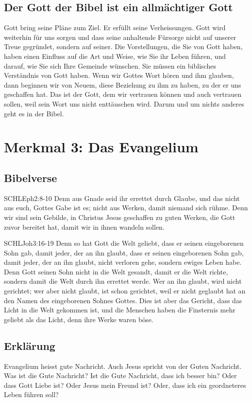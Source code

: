 \documentclass{../../inc/mybib}
\begin{document}
\subsection{Der Gott der Bibel ist ein allmächtiger Gott}
Gott bring seine Pläne zum Ziel. Er erfüllt seine Verheissungen. Gott wird weiterhin für uns sorgen und dass seine anhaltende Fürsorge nicht auf unserer Treue gegründet, sondern auf seiner. Die Vorstellungen, die Sie von Gott haben, haben einen Einfluss auf die Art und Weise, wie Sie ihr Leben führen, und darauf, wie Sie sich Ihre Gemeinde wünschen. Sie müssen ein biblisches Verständnis von Gott haben. Wenn wir Gottes Wort hören und ihm glauben, dann beginnen wir von Neuem, diese Beziehung zu ihm zu haben, zu der er uns geschaffen hat. Das ist der Gott, dem wir vertrauen können und auch vertrauen sollen, weil sein Wort uns nicht enttäuschen wird. Darum und um nichts anderes geht es in der Bibel.
\section{Merkmal 3: Das Evangelium}
\subsection{Bibelverse}
\begin{bibelbox}{SCHL}{Eph}{2:8-10}
    Denn aus Gnade seid ihr errettet durch Glaube, und das nicht aus euch, Gottes Gabe ist es; nicht aus Werken, damit niemand sich rühme. Denn wir sind sein Gebilde, in Christus Jesus geschaffen zu guten Werken, die Gott zuvor bereitet hat, damit wir in ihnen wandeln sollen.
\end{bibelbox}
\begin{bibelbox}{SCHL}{Joh}{3:16-19}
    Denn so hat Gott die Welt geliebt, dass er seinen eingeborenen Sohn gab, damit jeder, der an ihn glaubt, dass er seinen eingeborenen Sohn gab, damit jeder, der an ihn glaubt, nicht verloren gehe, sondern ewiges Leben habe. Denn Gott seinen Sohn nicht in die Welt gesandt, damit er die Welt richte, sondern damit die Welt durch ihn errettet werde. Wer an ihn glaubt, wird nicht gerichtet; wer aber nicht glaubt, ist schon gerichtet, weil er nicht geglaubt hat an den Namen des eingeborenen Sohnes Gottes. Dies ist aber das Gericht, dass das Licht in die Welt gekommen ist, und die Menschen haben die Finsternis mehr geliebt als das Licht, denn ihre Werke waren böse.
\end{bibelbox}
\subsection{Erklärung}
Evangelium heisst gute Nachricht. Auch Jesus spricht von der Guten Nachricht. Was ist die Gute Nachricht?  Ist die Gute Nachricht, dass ich besser bin? Oder dass Gott Liebe ist? Oder Jesus mein Freund ist? Oder, dass ich ein geordneteres Leben führen soll?
\end{document}
